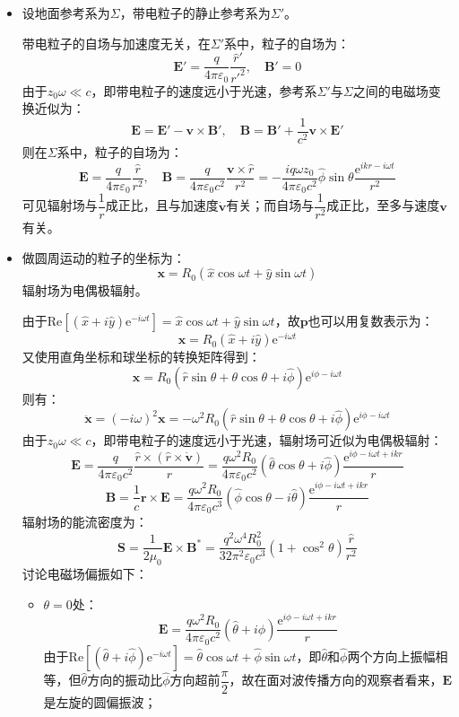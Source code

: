 \documentclass[a4paper,fontset=none]{ctexart}
\begin{document}
\begin{itemize}
    \item[3.(2)]
    设地面参考系为$\varSigma$，带电粒子的静止参考系为$\varSigma'$。

    带电粒子的自场与加速度无关，在$\varSigma'$系中，粒子的自场为：
    \[
        \bm{E}' = \frac{q}{4\pi\varepsilon_0}\frac{\hat{r}'}{{r'}^2},\quad \bm{B}' = 0
    \]
    由于$z_0\omega\ll c$，即带电粒子的速度远小于光速，参考系$\varSigma'$与$\varSigma$之间的电磁场变换近似为：
    \[
        \bm{E} = \bm{E}' - \bm{v} \times \bm{B}',\quad
        \bm{B} = \bm{B}' + \frac{1}{c^2}\bm{v} \times \bm{E}'
    \]
    则在$\varSigma$系中，粒子的自场为：
    \[
        \bm{E} = \frac{q}{4\pi\varepsilon_0}\frac{\hat{r}}{r^2},\quad
        \bm{B} = \frac{q}{4\pi\varepsilon_0c^2}\frac{\bm{v}\times\hat{r}}{r^2} = -\frac{iq\omega z_0}{4\pi\varepsilon_0c^2} \hat{\phi}\sin\theta \frac{\mathrm{e}^{ikr-i\omega t}}{r^2}
    \]
    可见辐射场与$\dfrac{1}{r}$成正比，且与加速度$\dot{\bm{v}}$有关；而自场与$\dfrac{1}{r^2}$成正比，至多与速度$\bm{v}$有关。

    \item[4.]
    做圆周运动的粒子的坐标为：
    \[
        \bm{x} = R_0(\hat{x}\cos\omega t + \hat{y}\sin\omega t)
    \]
    辐射场为电偶极辐射。

    由于$\mathrm{Re}\left[(\hat{x} + i\hat{y})\mathrm{e}^{-i\omega t}\right]=\hat{x}\cos\omega t + \hat{y}\sin\omega t$，故$\bm{p}$也可以用复数表示为：
    \[
        \bm{x} = R_0(\hat{x} + i\hat{y})\mathrm{e}^{-i\omega t}
    \]
    又使用直角坐标和球坐标的转换矩阵得到：
    \[
        \bm{x} = R_0(\hat{r}\sin\theta + \theta\cos\theta + i\hat{\phi})\mathrm{e}^{i\phi-i\omega t}
    \]
    则有：
    \[
        \ddot{\bm{x}} = (-i\omega)^2\bm{x} = -\omega^2R_0(\hat{r}\sin\theta + \theta\cos\theta + i\hat{\phi})\mathrm{e}^{i\phi-i\omega t}
    \]
    由于$z_0\omega\ll c$，即带电粒子的速度远小于光速，辐射场可近似为电偶极辐射：
    \[
        \bm{E} = \frac{q}{4\pi\varepsilon_0c^2} \frac{\hat{r}\times(\hat{r}\times\dot{\bm{v}})}{r} = \frac{q\omega^2R_0}{4\pi\varepsilon_0c^2}(\hat{\theta}\cos\theta + i\hat{\phi})\frac{\mathrm{e}^{i\phi-i\omega t+ikr}}{r}
    \]
    \[
        \bm{B} = \frac{1}{c}\bm{r} \times \bm{E} = \frac{q\omega^2R_0}{4\pi\varepsilon_0c^3}(\hat{\phi}\cos\theta - i\hat{\theta})\frac{\mathrm{e}^{i\phi-i\omega t+ikr}}{r}
    \]
    辐射场的能流密度为：
    \[
        \bm{S} = \frac{1}{2\mu_0}\bm{E} \times \bm{B}^* = \frac{q^2\omega^4R_0^2}{32\pi^2\varepsilon_0c^3}(1 + \cos^2\theta)\frac{\hat{r}}{r^2}
    \]
    讨论电磁场偏振如下：
    \begin{itemize}
        \item[\bullet] $\theta=0$处：
        \[
             \bm{E} = \frac{q\omega^2R_0}{4\pi\varepsilon_0c^2}(\hat{\theta} + i\hat{\phi})\frac{\mathrm{e}^{i\phi-i\omega t+ikr}}{r}
        \]
        由于$\mathrm{Re}\left[(\hat{\theta} + i\hat{\phi})\mathrm{e}^{-i\omega t}\right]=\hat{\theta}\cos\omega t + \hat{\phi}\sin\omega t$，即$\hat{\theta}$和$\hat{\phi}$两个方向上振幅相等，但$\hat{\theta}$方向的振动比$\hat{\phi}$方向超前$\dfrac{\pi}{2}$，故在面对波传播方向的观察者看来，$\bm{E}$是左旋的圆偏振波；


\end{itemize}
\end{itemize}
\end{document}
